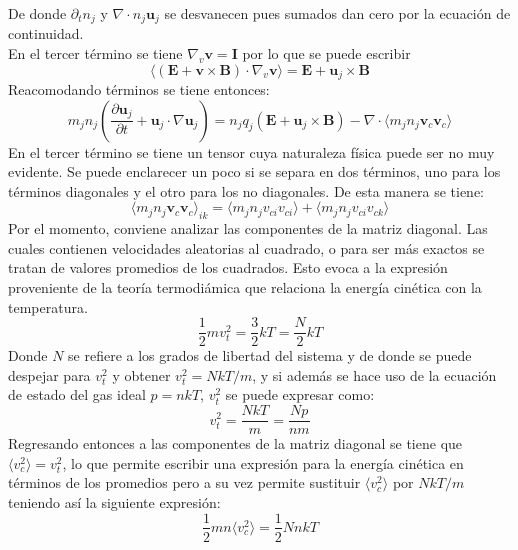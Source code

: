 \documentclass[../tesis_main_file.tex]{subfiles}
\begin{document}
De donde $\partial_t n_j$ y $\nabla \cdot n_j \textbf{u}_j$ se desvanecen pues sumados dan cero por la ecuación de continuidad.\\
En el tercer término se tiene $\nabla _v \textbf{v}=\textbf{I}$ por lo que se puede escribir
\begin{equation}
\langle (\textbf{E}+\textbf{v}\times \textbf{B})\cdot \nabla_v\textbf{v}\rangle = \textbf{E}+\textbf{u}_j\times \textbf{B}
\end{equation}
Reacomodando términos se tiene entonces:
\begin{equation}
\label{eq:momento_fluidos}
m_jn_j \left( \frac{\partial \textbf{u}_j}{\partial t}+\textbf{u}_j\cdot \nabla \textbf{u}_j \right)= n_jq_j(\textbf{E}+\textbf{u}_j\times \textbf{B})- \nabla \cdot \langle m_jn_j \textbf{v}_c \textbf{v}_c \rangle
\end{equation}
En el tercer término se tiene un tensor cuya naturaleza física puede ser no muy evidente. Se puede enclarecer un poco si se separa en dos términos, uno para los términos diagonales y el otro para los no diagonales. De esta manera se tiene:
\begin{equation}
\langle m_j n_j \textbf{v}_c \textbf{v}_c \rangle _{ik}=\langle m_j n_jv_{ci}v_{ci}\rangle+ \langle m_j n_jv_{ci}v_{ck}\rangle
\end{equation}
Por el momento, conviene analizar las componentes de la matriz diagonal. Las cuales contienen velocidades aleatorias al cuadrado, o para ser más exactos se tratan de valores promedios de los cuadrados. Esto evoca a la expresión proveniente de la teoría termodiámica que relaciona la energía cinética con la temperatura.
\begin{equation}
\frac{1}{2}mv_t^2 =\frac{3}{2}kT=\frac{N}{2}kT
\end{equation}
Donde $N$ se refiere a los grados de libertad del sistema y de donde se puede despejar para $v_t^2$ y obtener $v_t^2=NkT/m$, y si además se hace uso de la ecuación de estado del gas ideal $p=nkT$, $v^2_t$ se puede expresar como:
\begin{equation}
v_t^2=\frac{NkT}{m}=\frac{Np}{nm}
\end{equation}
Regresando entonces a las componentes de la matriz diagonal se tiene que $\langle v_c^2\rangle=v_t^2$, lo que permite escribir una expresión para la energía cinética en términos de los promedios pero a su vez permite sustituir $\langle v_c^2\rangle$ por $NkT/m$ teniendo así la siguiente expresión:
\begin{equation}
\frac{1}{2}mn \langle v_c^2\rangle = \frac{1}{2}NnkT
\end{equation}
\end{document}
